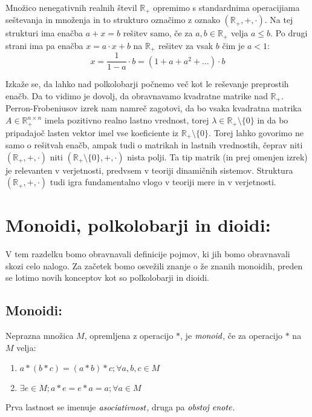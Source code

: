 \documentclass[mat1]{fmfdelo}
\newcommand{\Pplus}[1]{\mathbb{#1}_{+}}
\newcommand{\pojem}[1]{\ensuremath{\emph{#1}}}
\begin{document}
\begin{zgled}
	Množico nenegativnih realnih števil $\Pplus{R}$ opremimo s standardnima operacijiama seštevanja in množenja in to strukturo označimo z oznako $(\Pplus{R}, +, \cdot)$. Na tej strukturi ima enačba $a + x = b$ rešitev samo, če za $a, b\in\Pplus{R}$ velja $a\leq b$. Po drugi strani ima pa enačba $x = a\cdot x + b$ na $\Pplus{R}$ rešitev za vsak $b$ čim je $a < 1$: $$ x = \frac{1}{1 - a} \cdot b = (1 + a + a^2 + \ldots)\cdot b$$
\end{zgled}
Izkaže se, da lahko nad polkolobarji počnemo več kot le reševanje preprostih enačb. Da to vidimo je dovolj, da obravnavamo kvadratne matrike nad $\Pplus{R}$. Perron-Frobeniusov izrek nam namreč zagotovi, da bo vsaka kvadratna matrika $A \in\Pplus{R}^{n\times n}$ imela pozitivno realno lastno vrednost, torej $\lambda\in\Pplus{R}\setminus\{0\}$ in da bo pripadajoč lasten vektor imel vse koeficiente iz $\Pplus{R}\setminus\{0\}$. Torej lahko govorimo ne samo o rešitvah enačb, ampak tudi o matrikah in lastnih vrednostih, čeprav niti $(\Pplus{R}, +, \cdot)$ niti $(\Pplus{R}\setminus\{0\}, +, \cdot)$ nista polji. Ta tip matrik (in prej omenjen izrek) je relevanten v verjetnosti, predvsem v teoriji dinamičnih sistemov. Struktura $(\Pplus{R}, +, \cdot)$ tudi igra fundamentalno vlogo v teoriji mere in v verjetnosti.

\newpage

\section{Monoidi, polkolobarji in dioidi:}
V tem razdelku bomo obravnavali definicije pojmov, ki jih bomo obravnavali skozi celo nalogo. Za začetek bomo osvežili znanje o že znanih monoidih, preden se lotimo novih konceptov kot so polkolobarji in dioidi.
\subsection{Monoidi:}
\begin{definicija}
	Neprazna množica $M$, opremljena z operacijo $\ast$, je \pojem{monoid}, če za operacijo $\ast$ na $M$ velja:
	\begin{enumerate}
		\item $a \ast (b \ast c) = (a\ast b) \ast c;\forall a, b, c \in M$
		\item $\exists e\in M; a \ast e = e\ast a = a;\forall a\in M$
	\end{enumerate}
	Prva lastnost se imenuje \pojem{asociativnost}, druga pa \pojem{obstoj enote}. 
\end{definicija}
\end{document}
